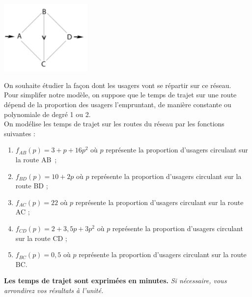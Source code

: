 \documentclass[a4paper,11pt,exos]{nsi} %
\begin{document}
\maketitle

{\includegraphics[width=4.5cm]{Braess.png}}

On souhaite étudier la façon dont les usagers vont se répartir sur ce réseau.\\

Pour simplifer notre modèle, on suppose que le temps de trajet sur une route dépend de la proportion des usagers l’empruntant, de manière constante ou polynomiale de degré 1 ou 2.\\
On modélise les temps de trajet sur les routes du réseau par les fonctions suivantes : 
\begin{enumerate}[label=\textbullet]
    \item $f_{AB}(p)=3+p+16p^2$ où $p$ représente la proportion d’usagers circulant sur la route AB ;
    \item $f_{BD}(p)=10+2p$ où $p$ représente la proportion d’usagers circulant sur la route BD ;
    \item $f_{AC}(p)=22$ où $p$ représente la proportion d’usagers circulant sur la route AC ;
    \item $f_{CD}(p)=2+3,5p+3p^2$ où $p$ représente la proportion d’usagers circulant sur la route CD ;
    \item $f_{BC}(p)=0,5$ où $p$ représente la proportion d’usagers circulant sur la route BC.
\end{enumerate}

\textbf{Les temps de trajet sont exprimées en minutes.} \textit{Si nécessaire, vous arrondirez vos résultats à l’unité.}
\end{document}
